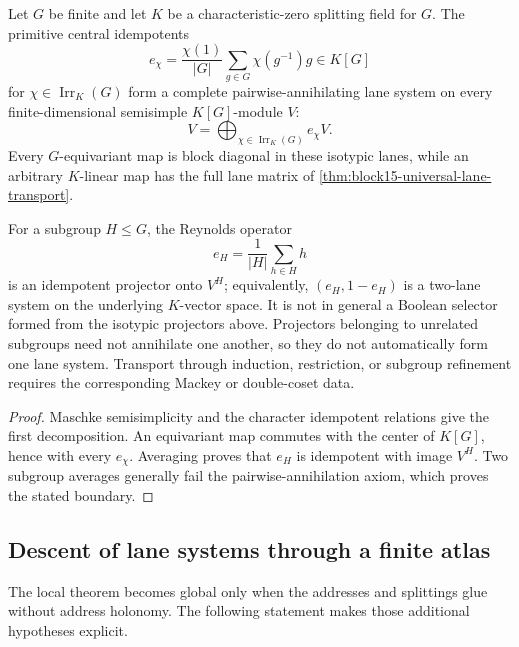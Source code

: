 \begin{proposition}
\label{prop:block15-galois-specialization}
Let \(G\) be finite and let \(K\) be a characteristic-zero splitting field
for \(G\).  The primitive central idempotents
\[
 e_\chi
 =
 \frac{\chi(1)}{|G|}
 \sum_{g\in G}\chi(g^{-1})g
 \in K[G]
\]
for \(\chi\in\operatorname{Irr}_K(G)\) form a complete
pairwise-annihilating lane system on every finite-dimensional
semisimple \(K[G]\)-module \(V\):
\[
 V=\bigoplus_{\chi\in\operatorname{Irr}_K(G)} e_\chi V.
\]
Every \(G\)-equivariant map is block diagonal in these isotypic lanes, while
an arbitrary \(K\)-linear map has the full lane matrix of
\cref{thm:block15-universal-lane-transport}.

For a subgroup \(H\le G\), the Reynolds operator
\[
 e_H=\frac1{|H|}\sum_{h\in H}h
\]
is an idempotent projector onto \(V^H\); equivalently,
\((e_H,1-e_H)\) is a two-lane system on the underlying \(K\)-vector space.
It is not in general a Boolean
selector formed from the isotypic projectors above.  Projectors belonging to unrelated
subgroups need not annihilate one another, so they do not automatically form
one lane system.  Transport through induction, restriction, or subgroup
refinement requires the corresponding Mackey or double-coset data.
\end{proposition}

\begin{proof}
Maschke semisimplicity and the character idempotent relations give the first
decomposition.  An equivariant map commutes with the center of \(K[G]\), hence
with every \(e_\chi\).  Averaging proves that \(e_H\) is idempotent with image
\(V^H\).  Two subgroup averages generally fail the pairwise-annihilation
axiom, which proves the stated boundary.
\end{proof}

\subsection{Descent of lane systems through a finite atlas}
\label{subsec:block15-lane-descent}

The local theorem becomes global only when the addresses and splittings glue
without address holonomy.  The following statement makes those additional
hypotheses explicit.

